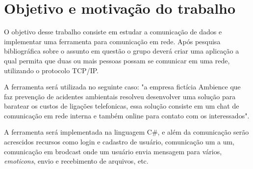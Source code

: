 \section{Objetivo e motivação do trabalho}
	O objetivo desse trabalho consiste em estudar a comunicação de dados e implementar uma ferramenta para comunicação em rede. Após pesquisa bibliográfica sobre o assunto em questão o grupo deverá criar uma aplicação a qual permita que duas ou mais pessoas possam se comunicar em uma rede, utilizando o protocolo TCP/IP.
	
	A ferramenta será utilizada no seguinte caso: "a empresa fictícia Ambience que faz prevenção de acidentes ambientais resolveu desenvolver uma solução para baratear os custos de ligações telefonicas, essa solução consiste em um chat de comunicação em rede interna e também online para contato com os interessados".
	
	A ferramenta será implementada na linguagem C\#, e além da comunicação serão acrescidos recursos como login e cadastro de usuário, comunicação um a um, comunicação em brodcast onde um usuário envia mensagem para vários, \textit{emoticons}, envio e recebimento de arquivos, etc.